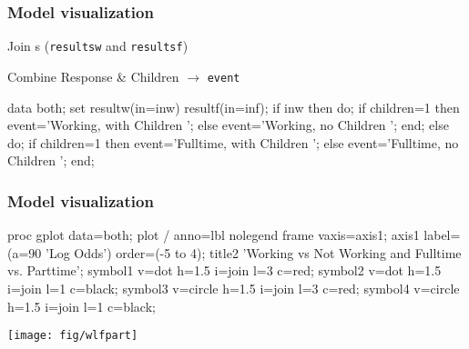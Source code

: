 \begin{frame}[fragile]
  \frametitle{Model visualization}
  \begin{itemize*}
	\item Join \ODS{}s (\texttt{resultsw} and \texttt{resultsf})
	\item Combine Response \& Children $\rightarrow$ \texttt{event}
  \end{itemize*}
\begin{Input}
data both;
   set resultw(in=inw)     
       resultf(in=inf);    
   if inw then do;
      if children=1 then event='Working, with Children ';
      else event='Working, no Children ';
   end;
   else do;
      if children=1 then event='Fulltime, with Children ';
      else event='Fulltime, no Children ';
  end;
\end{Input}
\end{frame}

\begin{frame}[fragile]
  \frametitle{Model visualization}
\begin{comment}
  \begin{itemize*}
	\item \texttt{plot logit * husinc = event;} $\rightarrow$ separate lines
  \end{itemize*}
\end{comment}
\begin{Input}[baselinestretch=0.7]
proc gplot data=both;
   plot  /
        anno=lbl nolegend frame vaxis=axis1;
   axis1 label=(a=90 'Log Odds') order=(-5 to 4);
   title2 'Working vs Not Working and Fulltime vs. Parttime';
   symbol1 v=dot    h=1.5 i=join l=3 c=red;
   symbol2 v=dot    h=1.5 i=join l=1 c=black;
   symbol3 v=circle h=1.5 i=join l=3 c=red;
   symbol4 v=circle h=1.5 i=join l=1 c=black;
\end{Input}
\begin{center}
  \texttt{[image: fig/wlfpart]}
\end{center}
\end{frame}

\endinput

\begin{frame}
  \frametitle{}
  \begin{itemize}
	\item{\large\bfseries }
      \begin{itemize*}
	  \item 
    	\begin{itemize*}
		\item 
		\item 
		\end{itemize*}
	  \item 
	  \end{itemize*}
	\item{\large\bfseries }
	\item{\large\bfseries }
  \end{itemize}
\end{frame}

